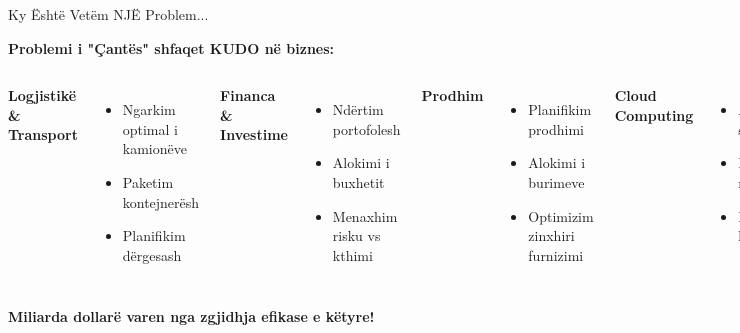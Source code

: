 \documentclass[aspectratio=169]{beamer}
\begin{document}
\begin{frame}{Ky Është Vetëm NJË Problem...}
\begin{center}
\textbf{Problemi i "Çantës" shfaqet KUDO në biznes:}
\end{center}

\vspace{0.5cm}

\begin{columns}
\textbf{Logjistikë \& Transport}
\begin{itemize}
    \item Ngarkim optimal i kamionëve
    \item Paketim kontejnerësh
    \item Planifikim dërgesash
\end{itemize}

\vspace{0.3cm}
\textbf{Financa \& Investime}
\begin{itemize}
    \item Ndërtim portofolesh
    \item Alokimi i buxhetit
    \item Menaxhim risku vs kthimi
\end{itemize}

\textbf{Prodhim}
\begin{itemize}
    \item Planifikim prodhimi
    \item Alokimi i burimeve
    \item Optimizim zinxhiri furnizimi
\end{itemize}

\vspace{0.3cm}
\textbf{Cloud Computing}
\begin{itemize}
    \item Alokimi i serverëve
    \item Balancim ngarkesash
    \item Minimizim kostosh
\end{itemize}
\end{columns}

\vspace{0.5cm}
\begin{center}
\large \textcolor{aiblue}{\textbf{Miliarda dollarë varen nga zgjidhja efikase e këtyre!}}
\end{center}
\end{frame}
\end{document}
